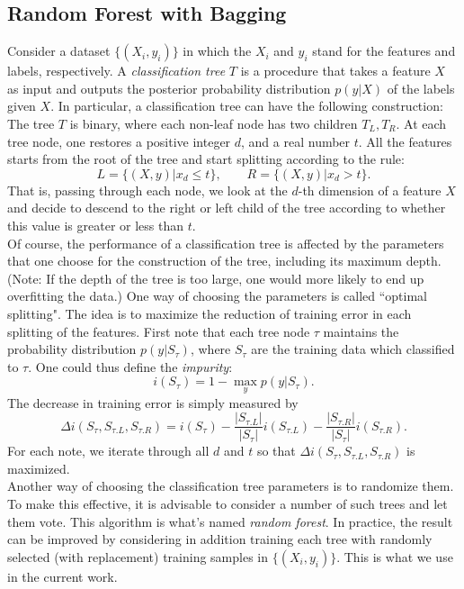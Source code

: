 \documentclass{article} %
\begin{document}
				

\subsection{Random Forest with Bagging}
Consider a dataset $\{(X_i, y_i)\}$ in which the $X_i$ and $y_i$ stand for the features and labels, respectively. A {\it classification tree} $T$ is a procedure that
 takes a feature $X$ as input and outputs the posterior probability distribution $p(y|X)$ of the labels given $X$. In particular, a classification tree can have the
 following construction:  The tree $T$ is binary, where each non-leaf node has two children $T_L, T_R$. At each tree node, one restores a positive integer $d$, and a real 
 number $t$. All the features starts from the root of the tree and start splitting according to the rule:
 			\[
				L = \{(X,y)|x_d\le t\}, \qquad R = \{(X,y)|x_d>t\}.
			\]
That is, passing through each node, we look at the $d$-th dimension of a feature $X$ and decide to descend to the right or left child of the tree according to whether
this value is greater or less than $t$.
\\

Of course, the performance of a classification tree is affected by the parameters that one choose for the construction of the tree, including its maximum depth. (Note: If
the depth of the tree is too large, one would more likely to end up overfitting the data.) One way of choosing the parameters is called ``optimal splitting". The idea is 
to maximize the reduction of training error in each splitting of the features. First note that each tree node $\tau$ maintains the probability distribution $p(y|S_\tau)$,
where $S_\tau$ are the training data which classified to $\tau$. One 
could thus define the {\it impurity}:
			\[
				i(S_\tau) = 1-\max_y p(y|S_\tau). 
			\]
The decrease in training error is simply measured by
			\[
				\Delta i(S_\tau,S_{\tau.L}, S_{\tau.R}) = i(S_\tau) - \frac{|S_{\tau.L}|}{|S_\tau|}i(S_{\tau.L})-\frac{|S_{\tau.R}|}{|S_\tau|}i(S_{\tau.R}).
			\]			
For each note, we iterate through all $d$ and $t$ so that $\Delta i(S_\tau,S_{\tau.L}, S_{\tau.R}) $ is maximized.
\\

Another way of choosing the classification tree parameters is to randomize them. To make this effective, it is advisable to consider a number of such trees
and let them vote. This algorithm is what's named {\it random forest}. In practice, the result can be improved by considering in addition training each tree with
randomly selected (with replacement) training samples in $\{(X_i,y_i)\}$.  This is what we use in the current work. 
\\
\end{document}
